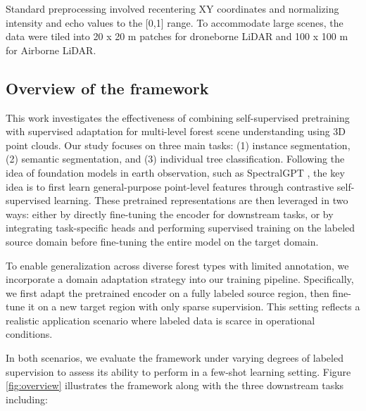 \documentclass[review,authoryear]{elsarticle}
\begin{document}


Standard preprocessing involved recentering XY coordinates and normalizing intensity and echo values to the [0,1] range. To accommodate large scenes, the data were tiled into 20 x 20 m patches for droneborne LiDAR and 100 x 100 m for Airborne LiDAR. 



\subsection{Overview of the framework}
This work investigates the effectiveness of combining self-supervised pretraining with supervised adaptation for multi-level forest scene understanding using 3D point clouds. Our study focuses on three main tasks: (1) instance segmentation, (2) semantic segmentation, and (3) individual tree classification. Following the idea of foundation models in earth observation, such as SpectralGPT \citep{10490262}, the key idea is to first learn general-purpose point-level features through contrastive self-supervised learning. These pretrained representations are then leveraged in two ways: either by directly fine-tuning the encoder for downstream tasks, or by integrating task-specific heads and performing supervised training on the labeled source domain before fine-tuning the entire model on the target domain. 

To enable generalization across diverse forest types with limited annotation, we incorporate a domain adaptation strategy into our training pipeline. Specifically, we first adapt the pretrained encoder on a fully labeled source region, then fine-tune it on a new target region with only sparse supervision. This setting reflects a realistic application scenario where labeled data is scarce in operational conditions. 

In both scenarios, we evaluate the framework under varying degrees of labeled supervision to assess its ability to perform in a few-shot learning setting. Figure \ref{fig:overview} illustrates the framework along with the three downstream tasks including:
\end{document}
